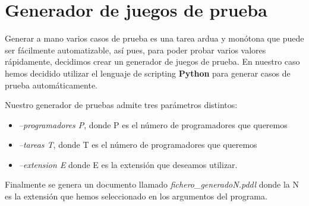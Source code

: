 \documentclass[11pt]{article}
\begin{document}
\newpage
\appendix
\appendixpage
\addappheadtotoc

\section{Generador de juegos de prueba}

Generar a mano varios casos de prueba es una tarea ardua y monótona que puede ser fácilmente automatizable, así pues, para poder probar varios valores rápidamente, decidimos crear un generador de juegos de prueba. En nuestro caso hemos decidido utilizar el lenguaje de scripting \textbf{Python} para generar casos de prueba automáticamente.
\medskip

Nuestro generador de pruebas admite tres parámetros distintos:
\begin{itemize}
	\item \textit{--programadores P}, donde P es el número de programadores que queremos
	\item \textit{--tareas T}, donde T es el número de programadores que queremos
	\item \textit{--extension E} donde E es la extensión que deseamos utilizar. 
\end{itemize}
\medskip
\noindent Finalmente se genera un documento llamado \textit{fichero\_generadoN.pddl} donde la N es la extensión que hemos seleccionado en los argumentos del programa. 
\end{document}
